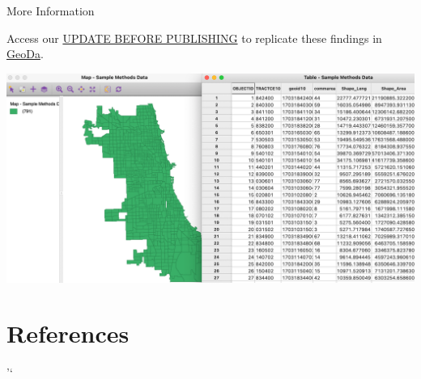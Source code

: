\documentclass[
]{book}
\begin{document}
More Information

Access our \href{https://geodacenter.github.io/data-and-lab/snow/}{UPDATE BEFORE PUBLISHING} to replicate these findings in \href{https://geodacenter.github.io}{GeoDa}.

\includegraphics{images/racialdiversity6.png}

\hypertarget{references}{%
\chapter*{References}\label{references}}

'`

  
\end{document}
